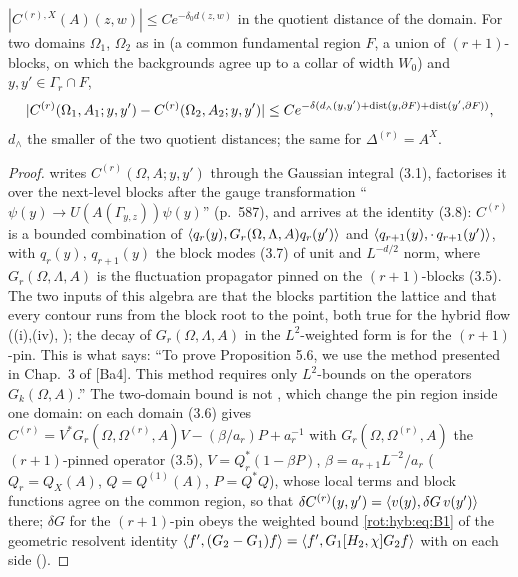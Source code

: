 \begin{corollary}\label{rot:hyb:cor:Ck}
$|C^{(r),X}(A)(z,w)|\le Ce^{-\delta_0d(z,w)}$ in the quotient distance of the domain. For two domains $\Omega_1$, $\Omega_2$ as in  (a common fundamental region $F$, a union of $(r+1)$-blocks, on which the backgrounds agree up to a collar of width $W_0$) and $y,y'\in\Gamma_r\cap F$,
\[
|C^{(r)}(\Omega_1,A_1;y,y')-C^{(r)}(\Omega_2,A_2;y,y')|\le Ce^{-\delta(d_\wedge(y,y')+\operatorname{dist}(y,\partial F)+\operatorname{dist}(y',\partial F))},
\]
$d_\wedge$ the smaller of the two quotient distances; the same for $\Delta^{(r)}=A^X$.
\end{corollary}
\begin{proof}
\cite[\S3]{Ba4} writes $C^{(r)}(\Omega,A;y,y')$ through the Gaussian integral (3.1), factorises it over the next-level blocks after the gauge transformation ``$\psi(y)\to U(A(\Gamma_{y,z}))\psi(y)$'' (p.~587), and arrives at the identity (3.8): $C^{(r)}$ is a bounded combination of $\langle q_r(y),G_r(\Omega,\Lambda,A)q_r(y')\rangle$ and $\langle q_{r+1}(y),\cdot\,q_{r+1}(y')\rangle$, with $q_r(y)$, $q_{r+1}(y)$ the block modes (3.7) of unit and $L^{-d/2}$ norm, where $G_r(\Omega,\Lambda,A)$ is the fluctuation propagator pinned on the $(r+1)$-blocks (3.5). The two inputs of this algebra are that the blocks partition the lattice and that every contour runs from the block root to the point, both true for the hybrid flow ((i),(iv), ); the decay of $G_r(\Omega,\Lambda,A)$ in the $L^2$-weighted form is  for the $(r+1)$-pin. This is what \cite[pp.~345--346]{K2} says: ``To prove Proposition 5.6, we use the method presented in Chap.~3 of [Ba4]. This method requires only $L^2$-bounds on the operators $G_k(\Omega,A)$.'' The two-domain bound is not \cite[(3.9)--(3.10)]{Ba4}, which change the pin region inside one domain: on each domain (3.6) gives $C^{(r)}=V^*G_r(\Omega,\Omega^{(r)},A)V-(\beta/a_r)P+a_r^{-1}$ with $G_r(\Omega,\Omega^{(r)},A)$ the $(r+1)$-pinned operator (3.5), $V=Q_r^*(1-\beta P)$, $\beta=a_{r+1}L^{-2}/a_r$ ($Q_r=Q_X(A)$, $Q=Q^{(1)}(A)$, $P=Q^*Q$), whose local terms and block functions agree on the common region, so that $\delta C^{(r)}(y,y')=\langle v(y),\delta G\,v(y')\rangle$ there; $\delta G$ for the $(r+1)$-pin obeys the weighted bound \eqref{rot:hyb:eq:B1} of the geometric resolvent identity $\langle f',(G_2-G_1)f\rangle=\langle f',G_1[H_2,\chi]G_2f\rangle$ with  on each side ().
\end{proof}
